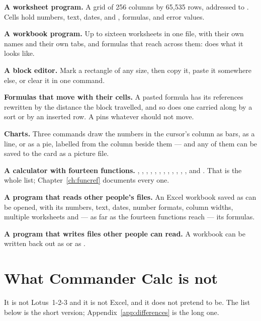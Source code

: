 \begin{ccsteps}
\item \textbf{A worksheet program.} A grid of 256 columns by 65,535 rows,
addressed  to . Cells hold numbers, text, dates,
 and , formulas, and error values.
\item \textbf{A workbook program.} Up to sixteen worksheets in one file, with
their own names and their own tabs, and formulas that reach across them:
 does what it looks like.
\item \textbf{A block editor.} Mark a rectangle of any size, then copy it,
paste it somewhere else, or clear it in one command.
\item \textbf{Formulas that move with their cells.} A pasted formula has its
references rewritten by the distance the block travelled, and so does one
carried along by a sort or by an inserted row. A \fml{\$} pins whatever should
not move.
\item \textbf{Charts.} Three commands draw the numbers in the cursor's column
as bars, as a line, or as a pie, labelled from the column beside them --- and
any of them can be saved to the card as a picture file.
\item \textbf{A calculator with fourteen functions.} , ,
, , , , , , ,
, , ,  and . That is the whole list;
Chapter~\ref{ch:funcref} documents every one.
\item \textbf{A program that reads other people's files.} An Excel workbook
saved as  can be opened, with its numbers, text, dates, number
formats, column widths, multiple worksheets and --- as far as the fourteen
functions reach --- its formulas.
\item \textbf{A program that writes files other people can read.} A workbook
can be written back out as  or as .
\end{ccsteps}

\section{What Commander Calc is not}

It is not Lotus~1-2-3 and it is not Excel, and it does not pretend to be. The
list below is the short version; Appendix~\ref{app:differences} is the long one.

